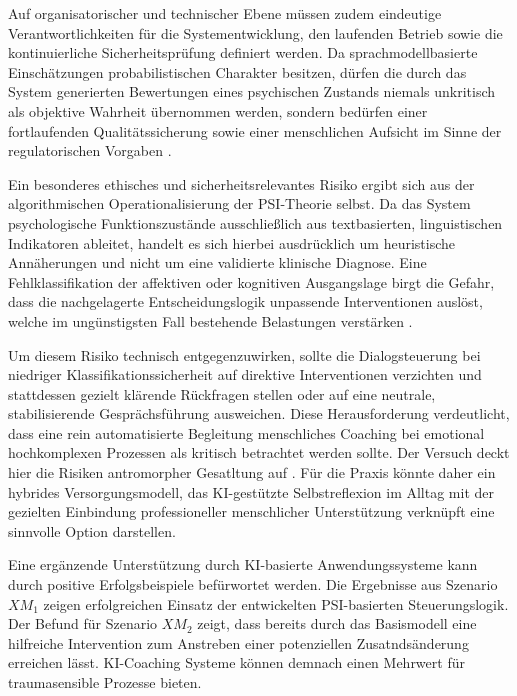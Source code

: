 Auf organisatorischer und technischer Ebene müssen zudem eindeutige Verantwortlichkeiten 
für die Systementwicklung, den laufenden Betrieb sowie die kontinuierliche 
Sicherheitsprüfung definiert werden. Da sprachmodellbasierte Einschätzungen 
probabilistischen Charakter besitzen, dürfen die durch das System generierten 
Bewertungen eines psychischen Zustands niemals unkritisch als objektive Wahrheit 
übernommen werden, sondern bedürfen einer fortlaufenden Qualitätssicherung sowie einer menschlichen Aufsicht 
im Sinne der regulatorischen Vorgaben \citep[vgl. Art.~14]{eu2024aiact}.

Ein besonderes ethisches und sicherheitsrelevantes Risiko ergibt sich aus der 
algorithmischen Operationalisierung der PSI-Theorie selbst. Da das System psychologische 
Funktionszustände ausschließlich aus textbasierten, linguistischen Indikatoren ableitet, 
handelt es sich hierbei ausdrücklich um heuristische Annäherungen und nicht um eine 
validierte klinische Diagnose. Eine Fehlklassifikation der affektiven oder kognitiven 
Ausgangslage birgt die Gefahr, dass die nachgelagerte Entscheidungslogik unpassende 
Interventionen auslöst, welche im ungünstigsten Fall bestehende Belastungen verstärken \citep{passmore2023can}.

Um diesem Risiko technisch entgegenzuwirken, sollte die Dialogsteuerung bei 
niedriger Klassifikationssicherheit auf direktive 
Interventionen verzichten und stattdessen gezielt klärende Rückfragen stellen oder auf 
eine neutrale, stabilisierende Gesprächsführung ausweichen.
Diese Herausforderung verdeutlicht, dass eine rein automatisierte Begleitung menschliches Coaching bei 
emotional hochkomplexen Prozessen als kritisch betrachtet werden sollte. Der Versuch deckt hier die Risiken antromorpher Gesatltung auf \citep{Xiao2025Humanizing}. Für die Praxis könnte 
daher ein hybrides Versorgungsmodell, das KI-gestützte Selbstreflexion im Alltag 
mit der gezielten Einbindung professioneller menschlicher Unterstützung verknüpft eine sinnvolle Option darstellen.

Eine ergänzende Unterstützung durch KI-basierte Anwendungssysteme kann durch positive Erfolgsbeispiele befürwortet werden. Die Ergebnisse aus Szenario $XM_1$ zeigen erfolgreichen Einsatz der entwickelten PSI-basierten Steuerungslogik. Der Befund für Szenario $XM_2$ zeigt, dass bereits durch das Basismodell eine hilfreiche Intervention zum Anstreben einer potenziellen Zusatndsänderung erreichen lässt. KI-Coaching Systeme können demnach einen Mehrwert für traumasensible Prozesse bieten. 


